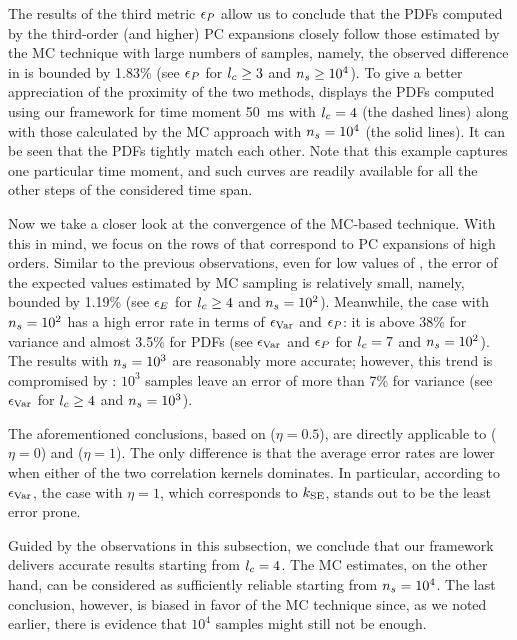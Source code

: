 The results of the third metric $\epsilon_{\probability}$ allow us to conclude
that the PDFs computed by the third-order (and higher) PC expansions closely
follow those estimated by the MC technique with large numbers of samples,
namely, the observed difference in  is bounded by 1.83\%
(see $\epsilon_{\probability}$ for ${l_{c}} \geq 3$ and ${n_{s}} \geq 10^4$). To give a
better appreciation of the proximity of the two methods,
 displays the PDFs computed using our framework
for time moment 50~ms with ${l_{c}} = 4$ (the dashed lines) along with those
calculated by the MC approach with ${n_{s}} = 10^4$ (the solid lines). It can be
seen that the PDFs tightly match each other. Note that this example captures one
particular time moment, and such curves are readily available for all the other
steps of the considered time span.

Now we take a closer look at the convergence of the MC-based technique. With
this in mind, we focus on the rows of  that correspond to
PC expansions of high orders. Similar to the previous observations, even for low
values of \ns, the error of the expected values estimated by MC sampling is
relatively small, namely, bounded by 1.19\% (see $\epsilon_{\expectation}$ for
${l_{c}} \geq 4$ and ${n_{s}} = 10^2$). Meanwhile, the case with ${n_{s}} = 10^2$ has a high
error rate in terms of $\epsilon_{\variance}$ and $\epsilon_{\probability}$: it
is above 38\% for variance and almost 3.5\% for PDFs (see $\epsilon_{\variance}$
and $\epsilon_{\probability}$ for ${l_{c}} = 7$ and ${n_{s}} = 10^2$). The results with
${n_{s}} = 10^3$ are reasonably more accurate; however, this trend is compromised by
: $10^3$ samples leave an error of more than 7\% for
variance (see $\epsilon_{\variance}$ for ${l_{c}} \geq 4$ and ${n_{s}} = 10^3$).

The aforementioned conclusions, based on  ($\eta = 0.5$),
are directly applicable to  ($\eta = 0$) and
 ($\eta = 1$). The only difference is that the average
error rates are lower when either of the two correlation kernels dominates. In
particular, according to $\epsilon_{\variance}$, the case with $\eta = 1$, which
corresponds to $k_{\mathrm{SE}}$, stands out to be the least error prone.

Guided by the observations in this subsection, we conclude that our framework
delivers accurate results starting from ${l_{c}} = 4$. The MC estimates, on the
other hand, can be considered as sufficiently reliable starting from ${n_{s}} =
10^4$. The last conclusion, however, is biased in favor of the MC technique
since, as we noted earlier, there is evidence that $10^4$ samples might still
not be enough.


